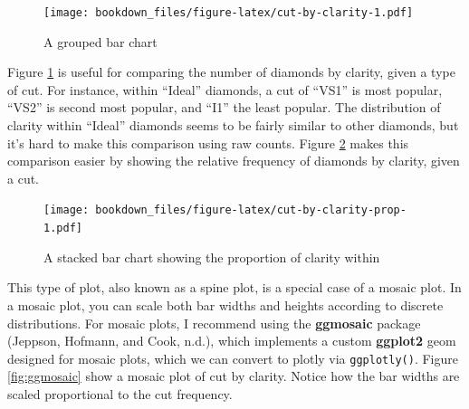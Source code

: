 \documentclass[12pt,]{isuthesis}
\newenvironment{Shaded}{\begin{snugshade}}{\end{snugshade}}
\newcommand{\KeywordTok}[1]{\textcolor[rgb]{0.13,0.29,0.53}{\textbf{{#1}}}}
\newcommand{\DataTypeTok}[1]{\textcolor[rgb]{0.13,0.29,0.53}{{#1}}}
\newcommand{\StringTok}[1]{\textcolor[rgb]{0.31,0.60,0.02}{{#1}}}
\newcommand{\CommentTok}[1]{\textcolor[rgb]{0.56,0.35,0.01}{\textit{{#1}}}}
\newcommand{\NormalTok}[1]{{#1}}
\begin{document}
\begin{figure}[htbp]
\centering
\texttt{[image: bookdown\_files/figure-latex/cut-by-clarity-1.pdf]}
\caption{\label{fig:cut-by-clarity}A grouped bar chart}
\end{figure}

Figure \ref{fig:cut-by-clarity} is useful for comparing the number of
diamonds by clarity, given a type of cut. For instance, within ``Ideal''
diamonds, a cut of ``VS1'' is most popular, ``VS2'' is second most
popular, and ``I1'' the least popular. The distribution of clarity
within ``Ideal'' diamonds seems to be fairly similar to other diamonds,
but it's hard to make this comparison using raw counts. Figure
\ref{fig:cut-by-clarity-prop} makes this comparison easier by showing
the relative frequency of diamonds by clarity, given a cut.

\begin{Shaded}
\end{Shaded}

\begin{figure}[htbp]
\centering
\texttt{[image: bookdown\_files/figure-latex/cut-by-clarity-prop-1.pdf]}
\caption{\label{fig:cut-by-clarity-prop}A stacked bar chart showing the
proportion of clarity within}
\end{figure}

This type of plot, also known as a spine plot, is a special case of a
mosaic plot. In a mosaic plot, you can scale both bar widths and heights
according to discrete distributions. For mosaic plots, I recommend using
the \textbf{ggmosaic} package (Jeppson, Hofmann, and Cook, n.d.), which
implements a custom \textbf{ggplot2} geom designed for mosaic plots,
which we can convert to plotly via \texttt{ggplotly()}. Figure
\ref{fig:ggmosaic} show a mosaic plot of cut by clarity. Notice how the
bar widths are scaled proportional to the cut frequency.
\end{document}
